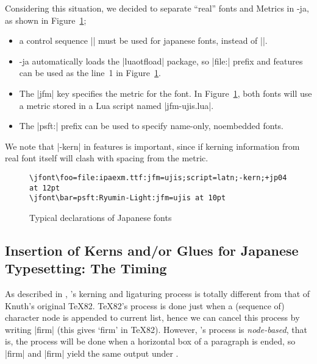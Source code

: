 \documentclass{ajt}
\begin{document}
Considering this situation, we decided to separate ``real'' fonts and
Metrics in \LuaTeX-ja, as shown in Figure~\ref{fig-jfdef};
\begin{itemize}
\item a control sequence |\jfont| must be used for japanese fonts, instead of |\font|.
\item \LuaTeX-ja automatically loads the |luaotfload| package, so
      |file:| prefix and features can be used as the line~1 in
      Figure~\ref{fig-jfdef}.
\item The |jfm| key specifies the metric for the font. In
      Figure~\ref{fig-jfdef}, both fonts will use a metric stored in a Lua script named 
      |jfm-ujis.lua|.
\item The |psft:| prefix can be used to specify name-only, noembedded
      fonts. 
\end{itemize}
We note that |-kern| in features is important, since if kerning information from real font itself will clash with spacing from the metric.

\begin{figure}
\begin{verbatim}
\jfont\foo=file:ipaexm.ttf:jfm=ujis;script=latn;-kern;+jp04 at 12pt
\jfont\bar=psft:Ryumin-Light:jfm=ujis at 10pt
\end{verbatim}
\caption{Typical declarations of Japanese fonts}
\label{fig-jfdef}
\end{figure}

\subsection{Insertion of Kerns and/or Glues for Japanese Typesetting: The Timing}
As described in \cite{luatexref}, \LuaTeX's kerning and ligaturing
process is totally different from that of Knuth's original \TeX82.
\TeX82's process is done just when a (sequence of) character node is
appended to current list, hence we can cancel this process by writing
|f{}irm| (this gives `f\hbox{}irm' in \TeX82).  However, \LuaTeX's process is
\emph{node-based}, that is, the process will be done when a horizontal
box of a paragraph is ended, so |f{}irm| and |firm| yield the same
output under \LuaTeX.
\end{document}
